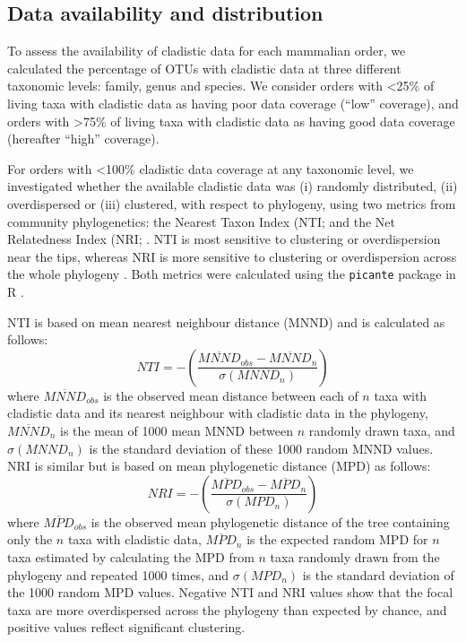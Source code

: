 \subsection{Data availability and distribution}
To assess the availability of cladistic data for each mammalian order, we calculated the percentage of OTUs with cladistic data at three different taxonomic levels: family, genus and species.
We consider orders with \textless 25\% of living taxa with cladistic data as having poor data coverage (``low'' coverage), and orders with \textgreater 75\% of living taxa with cladistic data as having good data coverage (hereafter ``high'' coverage). 

For orders with \textless 100\% cladistic data coverage at any taxonomic level, we investigated whether the available cladistic data was (i) randomly distributed, (ii) overdispersed or (iii) clustered, with respect to phylogeny, using two metrics from community phylogenetics: the Nearest Taxon Index (NTI; \citep{webb2002phylogenies} and the Net Relatedness Index (NRI; \citep{webb2002phylogenies}. 
NTI is most sensitive to clustering or overdispersion near the tips, whereas NRI is more sensitive to clustering or overdispersion across the whole phylogeny \citep{Cooper2008}. 
Both metrics were calculated using the \texttt{picante} package in R \citep{picante,R}.

NTI \citep{webb2002phylogenies} is based on mean nearest neighbour distance (MNND) and is calculated as follows:
  \begin{equation}
    NTI=-\left(\frac{\overline{MNND}_{obs}-\overline{MNND}_{n}}{\sigma(MNND_{n})}\right)
  \end{equation}
where $\overline{MNND}_{obs}$ is the observed mean distance between each of $n$ taxa with cladistic data and its nearest neighbour with cladistic data in the phylogeny, 
$\overline{MNND}_{n}$ is the mean of 1000 mean MNND between $n$ randomly drawn taxa, and $\sigma(MNND_{n})$ is the standard deviation of these 1000 random MNND values.
NRI is similar but is based on mean phylogenetic distance (MPD) as follows:
  \begin{equation}
    NRI=-\left(\frac{\overline{MPD}_{obs}-\overline{MPD}_{n}}{\sigma(MPD_{n})}\right)
  \end{equation}
where $\overline{MPD}_{obs}$ is the observed mean phylogenetic distance of the tree containing only the $n$ taxa with cladistic data, $\overline{MPD}_{n}$ is the expected random MPD for $n$ taxa estimated by calculating the MPD from $n$ taxa randomly drawn from the phylogeny and repeated 1000 times, and $\sigma(MPD_{n})$ is the standard deviation of the 1000 random MPD values. %
Negative NTI and NRI values show that the focal taxa are more overdispersed across the phylogeny than expected by chance, and positive values reflect significant clustering.

